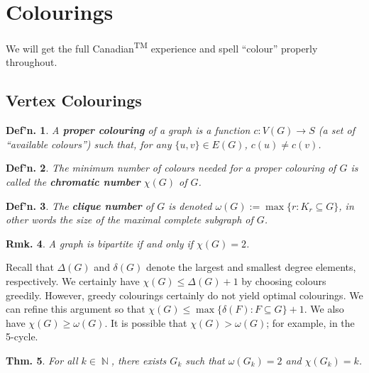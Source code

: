 \documentclass[12pt, a4paper]{book}
\DeclareMathOperator{\N}{\mathbb{N}}
\newtheorem{theorem}{Thm.}[section]
\newtheorem{definition}[theorem]{Def'n.}
\newtheorem{remark}[theorem]{Rmk.}
\theoremstyle{nonumberplain}
\begin{document}
\section{Colourings}
We will get the full Canadian\textsuperscript{TM} experience and spell ``colour'' properly throughout.
\subsection{Vertex Colourings}
\begin{definition}
    A \textbf{proper colouring} of a graph is a function $c:V(G)\to S$ (a set of ``available colours'') such that, for any $\{u,v\}\in E(G)$, $c(u)\neq c(v)$.
\end{definition}
\begin{definition}
    The minimum number of colours needed for a proper colouring of $G$ is called the \textbf{chromatic number} $\chi(G)$ of $G$.
\end{definition}
\begin{definition}
    The \textbf{clique number} of $G$ is denoted $\omega(G):=\max\{r:K_r\subseteq G\}$, in other words the size of the maximal complete subgraph of $G$.
\end{definition}
\begin{remark}
    A graph is bipartite if and only if $\chi(G)=2$.
\end{remark}
Recall that $\Delta(G)$ and $\delta(G)$ denote the largest and smallest degree elements, respectively.
We certainly have $\chi(G)\leq\Delta(G)+1$ by choosing colours greedily.
However, greedy colourings certainly do not yield optimal colourings.
We can refine this argument so that $\chi(G)\leq\max\{\delta(F):F\subseteq G\}+1$.
We also have $\chi(G)\geq\omega(G)$.
It is possible that $\chi(G)>\omega(G)$; for example, in the 5-cycle.
\begin{theorem}
    For all $k\in\N$, there exists $G_k$ such that $\omega(G_k)=2$ and $\chi(G_k)=k$.
\end{theorem}
\end{document}
